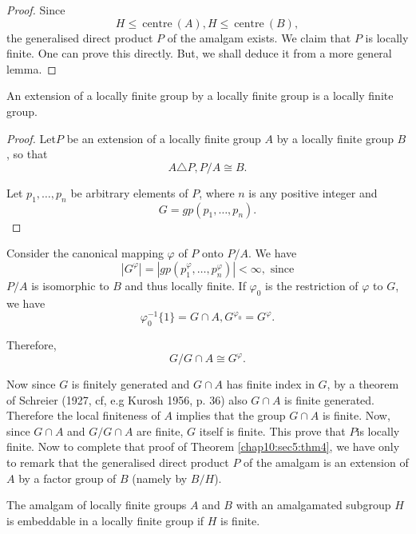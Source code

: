 \begin{proof}
  Since 
  $$
  H \le ~\text{centre}~ (A), H \le ~\text{centre}~ (B),
  $$
  the generalised direct product $P$ of the amalgam exists. We claim
  that $P$ is locally finite. One can prove this directly. But, we
  shall deduce it from a more general lemma. 
\end{proof}

\begin{lemma*}
  An extension of a locally finite group by a locally finite group is
  a locally finite group. 
\end{lemma*}

\begin{proof}
  Let\pageoriginale $P$ be an extension of a locally finite group $A$ by a locally
  finite group $B$, so that  
  $$
  A \triangle P,  P/A \cong B.
  $$

  Let $p_1, \ldots,  p_n$ be arbitrary elements of $P$, where $n$ is
  any positive integer and 
  $$
  G = gp(p_1, \ldots,  p_n).
  $$
\end{proof}

Consider the canonical mapping $\varphi$ of $P$ onto $P/A$. We have
$$
|G^\varphi | = | gp (p^{\varphi}_1, \ldots,  p^{\varphi}_n) | < \infty
,\text{ since} 
$$
$P/A$ is isomorphic to $B$ and thus locally finite. If $\varphi_0$ is
the restriction of $\varphi$ to $G$, we have 
$$
\varphi^{-1}_0 \bigg\{ 1 \bigg \} = G \cap A, G^{\varphi_0} = G^{\varphi}.
$$

Therefore,
$$
G/G \cap A \cong G^{\varphi}.
$$

Now since $G$ is finitely generated and $G \cap A$ has finite index in
$G$, by a theorem of Schreier (1927, cf, e.g Kurosh 1956, p. 36)
also $G \cap A$ is finite generated. Therefore the local finiteness of
$A$ implies that the group $G \cap A$ is finite. Now, since $G \cap A$
and $G / G \cap A$ are finite, $G$ itself is finite. This prove that
$P$\pageoriginale is locally finite. Now to complete that proof of
Theorem \ref{chap10:sec5:thm4}, we
have only to remark that the generalised direct product $P$ of the
amalgam is an extension of $A$ by a factor group of $B$ (namely by
$B/H$). 

\begin{theorem}\label{chap10:sec5:thm5}%
  The amalgam of locally finite groups $A$ and $B$ with an amalgamated
  subgroup $H$ is embeddable in a locally finite group if $H$ is
  finite. 
\end{theorem}


